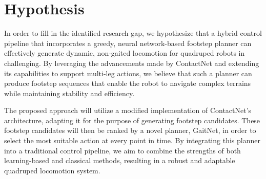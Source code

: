 \section{Hypothesis}

In order to fill in the identified research gap, we hypothesize that
a hybrid control pipeline that incorporates a greedy, neural network-based
footstep planner can effectively generate dynamic, non-gaited locomotion
for quadruped robots in challenging. By leveraging the advancements
made by ContactNet and extending its capabilities to support multi-leg
actions, we believe that such a planner can produce footstep sequences
that enable the robot to navigate complex terrains while maintaining
stability and efficiency.

The proposed approach will utilize a modified implementation of
ContactNet's architecture, adapting it for the purpose of generating
footstep candidates. These footstep candidates will then be ranked by
a novel planner, GaitNet, in order to select the most suitable action
at every point in time. By integrating this planner into a traditional
control pipeline, we aim to combine the strengths of both learning-based
and classical methods, resulting in a robust and adaptable quadruped
locomotion system.
